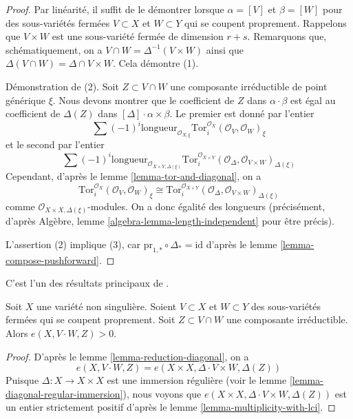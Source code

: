 \begin{proof}
Par linéarité, il suffit de le démontrer lorsque $\alpha = [V]$ et $\beta = [W]$
pour des sous-variétés fermées $V \subset X$ et $W \subset Y$ qui se coupent
proprement. Rappelons que $V \times W$ est une sous-variété fermée de dimension $r + s$.
Remarquons que, schématiquement, on a
$V \cap W = \Delta^{-1}(V \times W)$ ainsi que
$\Delta(V \cap W) = \Delta \cap V \times W$.
Cela démontre (1).

\medskip\noindent
Démonstration de (2). Soit $Z \subset V \cap W$ une composante irréductible
de point générique $\xi$. Nous devons montrer que le coefficient de
$Z$ dans $\alpha \cdot \beta$ est égal au coefficient de
$\Delta(Z)$ dans $[\Delta] \cdot \alpha \times \beta$. Le premier est donné
par l'entier
$$
\sum (-1)^i
\text{longueur}_{\mathcal{O}_{X, \xi}}
\text{Tor}_i^{\mathcal{O}_X}(\mathcal{O}_V, \mathcal{O}_W)_\xi
$$
et le second par l'entier
$$
\sum (-1)^i
\text{longueur}_{\mathcal{O}_{X \times Y, \Delta(\xi)}}
\text{Tor}_i^{\mathcal{O}_{X \times Y}}(
\mathcal{O}_\Delta, \mathcal{O}_{V \times W})_{\Delta(\xi)}
$$
Cependant, d'après le lemme \ref{lemma-tor-and-diagonal}, on a
$$
\text{Tor}_i^{\mathcal{O}_X}(\mathcal{O}_V, \mathcal{O}_W)_\xi \cong
\text{Tor}_i^{\mathcal{O}_{X \times Y}}(
\mathcal{O}_\Delta, \mathcal{O}_{V \times W})_{\Delta(\xi)}
$$
comme $\mathcal{O}_{X \times X, \Delta(\xi)}$-modules. On a donc égalité
des longueurs (précisément, d'après Algèbre, lemme \ref{algebra-lemma-length-independent}
pour être précis).

\medskip\noindent
L'assertion (2) implique (3), car
$\text{pr}_{1, *} \circ \Delta_* = \text{id}$ d'après
le lemme \ref{lemma-compose-pushforward}.
\end{proof}

\begin{proposition}
\label{proposition-positivity}
\begin{reference}
C'est l'un des résultats principaux de \cite{Serre_algebre_locale}.
\end{reference}
Soit $X$ une variété non singulière. Soient $V \subset X$ et
$W \subset Y$ des sous-variétés fermées qui se coupent proprement.
Soit $Z \subset V \cap W$ une composante irréductible.
Alors $e(X, V \cdot W, Z) > 0$.
\end{proposition}

\begin{proof}
D'après le lemme \ref{lemma-reduction-diagonal}, on a
$$
e(X, V \cdot W, Z) = e(X \times X, \Delta \cdot V \times W, \Delta(Z))
$$
Puisque $\Delta : X \to X \times X$ est une immersion régulière
(voir le lemme \ref{lemma-diagonal-regular-immersion}), nous voyons que
$e(X \times X, \Delta \cdot V \times W, \Delta(Z))$ est un entier strictement
positif d'après le lemme \ref{lemma-multiplicity-with-lci}.
\end{proof}

